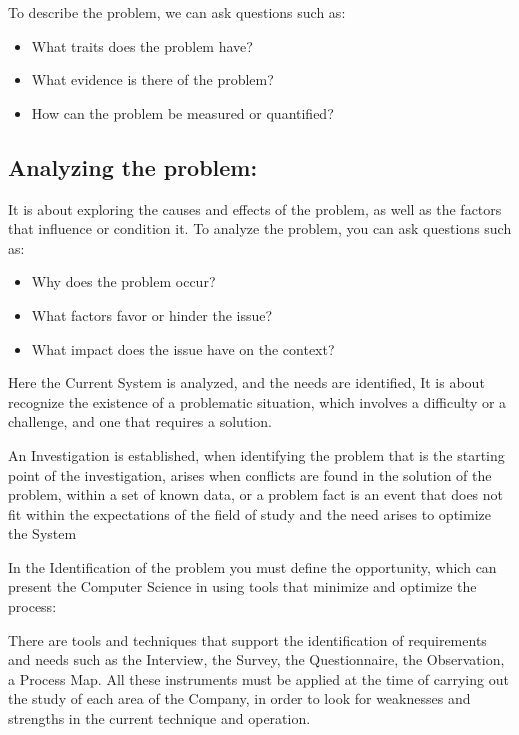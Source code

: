\documentclass{article}
\begin{document}
\par To describe the problem, we can ask questions such as:

\begin{itemize}
	\item What traits does the problem have?
	\item What evidence is there of the problem?
	\item How can the problem be measured or quantified?
\end{itemize}

\subsection{Analyzing the problem:}
\par It is about exploring the causes and effects of the problem, as well as
the factors that influence or condition it. To analyze the problem, you can ask
questions such as:

\begin{itemize}
	\item Why does the problem occur?
	\item What factors favor or hinder the issue?
	\item What impact does the issue have on the context?
\end{itemize}

\par Here the Current System is analyzed, and the needs are identified, It is
about recognize the existence of a problematic situation, which involves a
difficulty or a challenge, and one that requires a solution.

\par An Investigation is established, when identifying the problem that is the
starting point of the investigation, arises when conflicts are found in the
solution of the problem, within a set of known data, or a problem fact is an
event that does not fit within the expectations of the field of study and the
need arises to optimize the System

\par In the Identification of the problem you must define the opportunity, which
can present the Computer Science in using tools that minimize and optimize the
process:

\par There are tools and techniques that support the identification of
requirements and needs such as the Interview, the Survey, the Questionnaire, the
Observation, a Process Map. All these instruments must be applied at the time of
carrying out the study of each area of the Company, in order to look for
weaknesses and strengths in the current technique and operation.
\end{document}
